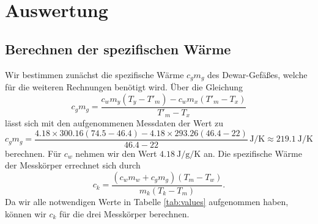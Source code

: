 \section{Auswertung}
\label{sec:Auswertung}
\subsection{Berechnen der spezifischen Wärme}
Wir bestimmen zunächst die spezifische Wärme $c_gm_g$ des Dewar-Gefäßes, welche für die weiteren Rechnungen benötigt wird.
Über die Gleichung
\begin{equation}
    c_gm_g = \frac{c_wm_y(T_y-T'_m)-c_wm_x(T'_m-T_x)}{T'_m-T_x}
\end{equation}
lässt sich mit den aufgenommenen Messdaten der Wert zu
\begin{equation} %
    c_gm_g = \frac{4.18\times300.16(74.5-46.4)-4.18\times293.26(46.4-22)}{46.4-22} \, \si{\joule\per\kelvin} \approx \SI{219.1}{\joule\per\kelvin} %
\end{equation}
berechnen.
Für $c_w$ nehmen wir den Wert $\SI{4.18}{\joule\per\g\per\kelvin}$ an\cite{Versuchsanleitung}. %
Die spezifische Wärme der Messkörper errechnet sich durch
\begin{equation}
    c_k = \frac{(c_wm_w + c_gm_g)(T_m - T_w)}{m_k(T_k - T_m)}.
\end{equation}
Da wir alle notwendigen Werte in Tabelle \ref{tab:values} aufgenommen haben, können wir $c_k$ für die drei Messkörper berechnen. %
